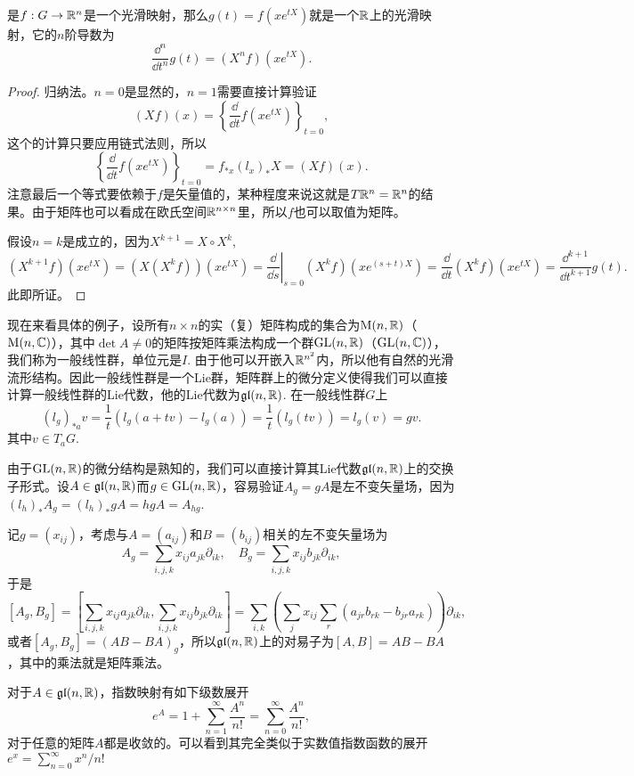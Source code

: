 \begin{lem}\label{exp}
是$f:G\to \mathbb{R}^n$是一个光滑映射，那么$g(t)=f(xe^{tX})$就是一个$\mathbb{R}$上的光滑映射，它的$n$阶导数为
\[
	\frac{\dd^n}{\dd t^n}g(t)=(X^nf)(x e^{tX}).
\]
\end{lem}

\begin{proof}
归纳法。$n=0$是显然的，$n=1$需要直接计算验证
\[
	(Xf)(x)=\left\{\frac{\dd}{\dd t}f(x e^{tX})\right\}_{t=0},
\]
这个的计算只要应用链式法则，所以
\[
	\left\{\frac{\dd}{\dd t}f(x e^{tX})\right\}_{t=0}=f_{*x}(l_{x})_*X=(Xf)(x).
\]
注意最后一个等式要依赖于$f$是矢量值的，某种程度来说这就是$T\mathbb{R}^n=\mathbb{R}^n$的结果。由于矩阵也可以看成在欧氏空间$\mathbb{R}^{n\times n}$里，所以$f$也可以取值为矩阵。

假设$n=k$是成立的，因为$X^{k+1}=X\circ X^k$,
\[
(X^{k+1}f)(x e^{tX})=(X(X^{k}f))(x e^{tX})
=\left.\frac{\dd}{\dd s}\right|_{s=0}(X^kf)(x e^{(s+t)X})
=\frac{\dd}{\dd t}(X^kf)(x e^{tX})
=\frac{\dd^{k+1}}{\dd t^{k+1}}g(t).
\]
此即所证。
\end{proof}

\para 现在来看具体的例子，设所有$n\times n$的实（复）矩阵构成的集合为$\operatorname{M}(n,\mathbb{R})$（$\operatorname{M}(n,\mathbb{C})$），其中$\det A\neq 0$的矩阵按矩阵乘法构成一个群$\operatorname{GL}(n,\mathbb{R})$（$\operatorname{GL}(n,\mathbb{C})$），我们称为一般线性群，单位元是$I$. 由于他可以开嵌入$\mathbb{R}^{n^2}$内，所以他有自然的光滑流形结构。因此一般线性群是一个Lie群，矩阵群上的微分定义使得我们可以直接计算一般线性群的Lie代数，他的Lie代数为$\mathfrak{gl}(n,\mathbb{R})$. 在一般线性群$G$上
\[
	(l_g)_{*a}v=\frac{1}{t}(l_g(a+tv)-l_g(a))
	=\frac{1}{t}(l_g(tv))=l_g(v)=gv.
\]
其中$v\in T_aG$.

由于$\operatorname{GL}(n,\mathbb{R})$的微分结构是熟知的，我们可以直接计算其Lie代数$\mathfrak{gl}(n,\mathbb{R})$上的交换子形式。设$A\in\mathfrak{gl}(n,\mathbb{R})$而$g\in\operatorname{GL}(n,\mathbb{R})$，容易验证$A_g=gA$是左不变矢量场，因为$(l_h)_{*}A_g=(l_h)_{*}gA=hgA=A_{hg}$.

记$g=(x_{ij})$，考虑与$A=(a_{ij})$和$B=(b_{ij})$相关的左不变矢量场为
\[
A_g=\sum_{i,j,k}x_{ij}a_{jk}\partial_{ik},\quad B_g=\sum_{i,j,k}x_{ij}b_{jk}\partial_{ik},
\]
于是
\[
[A_g,B_g]=\left[\sum_{i,j,k}x_{ij}a_{jk}\partial_{ik},\sum_{i,j,k}x_{ij}b_{jk}\partial_{ik}\right]=\sum_{i,k}\left(\sum_{j}x_{ij}\sum_{r}(a_{jr}b_{rk}-b_{jr}a_{rk})\right)\partial_{ik},
\]
或者$[A_g,B_g]=(AB-BA)_g$，所以$\mathfrak{gl}(n,\mathbb{R})$上的对易子为$[A,B]=AB-BA$，其中的乘法就是矩阵乘法。

\begin{pro}
对于$A\in\mathfrak{gl}(n,\mathbb{R})$，指数映射有如下级数展开
\[
	e^A=1+\sum_{n=1}^\infty \frac{A^n}{n!}=\sum_{n=0}^\infty \frac{A^n}{n!},
\]
对于任意的矩阵$A$都是收敛的。可以看到其完全类似于实数值指数函数的展开$e^x=\sum_{n=0}^\infty x^n/n!$
\end{pro}

